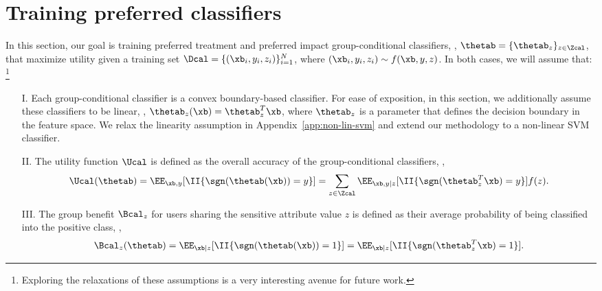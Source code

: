 \documentclass{article}
\newcommand{\xytup}{\xb,y}
\begin{document}
\section{Training preferred classifiers} \label{sec:classifiers}
In this section, our goal is training preferred treatment and preferred impact group-conditional classifiers, \ie, $\thetab = \{ \thetab_z \}_{z \in \Zcal}$, that maximize utility
given a training set $\Dcal = \{(\xb_i, y_i, z_i)\}_{i=1}^{N}$, where $(\xb_i, y_i, z_i) \sim f(\xb, y, z)$.
In both cases, we will assume that:
\footnote{\scriptsize Exploring the relaxations of these assumptions is a very interesting avenue for future work.}
\vspace{-1mm}
\begin{itemize}[leftmargin=6mm]
\item[I.] Each group-conditional classifier is a
convex boundary-based classifier. For ease of exposition, in this section, we additionally assume these classifiers to be linear, \ie, $\thetab_z(\xb) = \thetab_z^{T} \xb$, where
$\thetab_z$ is a parameter that defines the decision boundary in the feature space.
We relax the linearity assumption in Appendix~\ref{app:non-lin-svm} and extend our methodology to a non-linear SVM classifier.

\item[II.] The utility function $\Ucal$ is defined as the overall accuracy of the group-conditional classifiers, \ie,
\begin{equation}
\Ucal(\thetab) = \EE_{\xytup} [\II\{\sgn(\thetab(\xb)) = y\}] = \sum_{z \in \Zcal} \EE_{\xb, y | z} [\II\{\sgn(\thetab_z^{T} \xb) = y\}] f(z). \label{eq:utility}
\end{equation}
\vspace{-4mm}
\item[III.] The group benefit $\Bcal_z$ for users sharing the sensitive attribute value $z$ is defined as their average probability of being classified into the
positive class, \ie,
\begin{equation}
\Bcal_z(\thetab) = \EE_{\xb | z} [\II\{\sgn(\thetab(\xb)) = 1\}] =  \EE_{\xb | z} [\II\{\sgn(\thetab_z^{T} \xb) = 1\}]. \label{eq:group-benefit}
\end{equation}
\vspace{-4mm}
\end{itemize}
\end{document}
